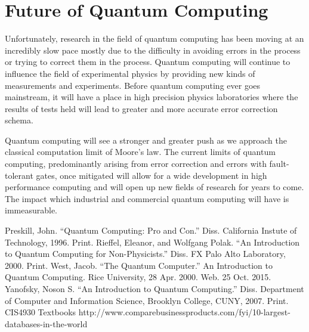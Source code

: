 \documentclass[12pt]{article}
\begin{document}
\section{Future of Quantum Computing}
Unfortunately, research in the field of quantum computing has been moving at an incredibly slow pace mostly due to the difficulty in avoiding errors in the process or trying to correct them in the process. Quantum computing will continue to influence the field of experimental physics by providing new kinds of measurements and experiments. Before quantum computing ever goes mainstream, it will have a place in high precision physics laboratories where the results of tests held will lead to greater and more accurate error correction schema.\cite{pro}\par
Quantum computing will see a stronger and greater push as we approach the classical computation limit of Moore's law. The current limits of quantum computing, predominantly arising from error correction and errors with fault-tolerant gates, once mitigated will allow for a wide development in high performance computing and will open up new fields of research for years to come. The impact which industrial and commercial quantum computing will have is immeasurable.







\newpage

\begin{thebibliography}{1}
Preskill, John. ``Quantum Computing: Pro and Con.'' Diss. California Instute of Technology, 1996. Print. 
Rieffel, Eleanor, and Wolfgang Polak. ``An Introduction to Quantum Computing for Non-Physicists.'' Diss. FX Palo Alto Laboratory, 2000. Print. 
West, Jacob. ``The Quantum Computer.'' An Introduction to Quantum Computing. Rice University, 28 Apr. 2000. Web. 25 Oct. 2015. 
Yanofsky, Noson S. ``An Introduction to Quantum Computing.'' Diss. Department of Computer and Information Science, Brooklyn College, CUNY, 2007. Print. 
CIS4930 Textbooks
http://www.comparebusinessproducts.com/fyi/10-largest-databases-in-the-world
\end{thebibliography}

\clearpage
\end{document}
